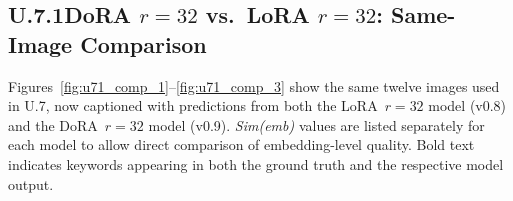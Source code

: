 \documentclass[onecolumn]{article}
\begin{document}
\clearpage
\clearpage
\subsection*{U.7.1\quad DoRA $r{=}32$ vs.\ LoRA $r{=}32$: Same-Image Comparison}
\label{sec:u71}

Figures~\ref{fig:u71_comp_1}--\ref{fig:u71_comp_3} show the same twelve images
used in U.7, now captioned with predictions from both the LoRA~$r{=}32$ model
(v0.8) and the DoRA~$r{=}32$ model (v0.9).
\textit{Sim(emb)} values are listed separately for each model to allow
direct comparison of embedding-level quality.
Bold text indicates keywords appearing in both the ground truth and the
respective model output.
\end{document}
